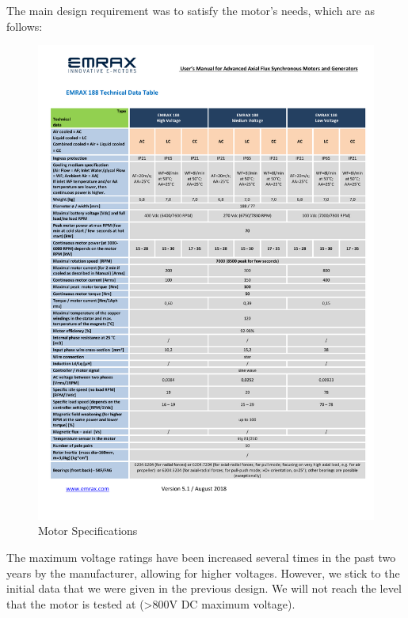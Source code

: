 The main design requirement was to satisfy the motor's needs, which are as follows:
\begin{figure}[H]
    \centering
    \includegraphics[page=2,width=\textwidth]{texfiles/mech/eimg/propulsion/table_motor}
    \caption{Motor Specifications}
    \label{fig: Motor Specifications}
\end{figure}

The maximum voltage ratings have been increased several times in the past two years by the manufacturer, allowing for higher voltages. However, we stick to the initial data that we were given in the previous design. We will not reach the level that the motor is tested at (>800V DC maximum voltage). \\
